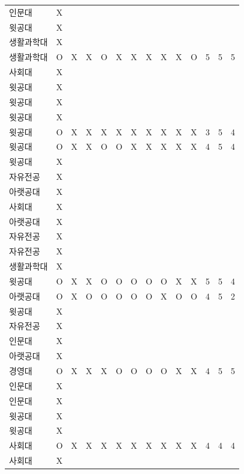 \documentclass[11pt,a4paper]{article}
\begin{document}
\begin{center}
\begin{supertabular}{ | p{2cm} | x{1.6cm} | x{0.5cm} | x{0.5cm} | x{0.5cm} | x{0.5cm} | x{0.5cm} | x{0.5cm} | x{0.5cm} | x{0.5cm} | x{0.5cm} | x{0.5cm} | x{0.5cm} | x{0.5cm} | }
인문대 & X & & & & & & & & & & & & \\
윗공대 & X & & & & & & & & & & & & \\
생활과학대 & X & & & & & & & & & & & & \\
생활과학대 & O & X & X & O & X & X & X & X & X & O & 5 & 5 & 5 \\
사회대 & X & & & & & & & & & & & & \\
윗공대 & X & & & & & & & & & & & & \\
윗공대 & X & & & & & & & & & & & & \\
윗공대 & X & & & & & & & & & & & & \\
윗공대 & O & X & X & X & X & X & X & X & X & X & 3 & 5 & 4 \\
윗공대 & O & X & X & O & O & X & X & X & X & X & 4 & 5 & 4 \\
윗공대 & X & & & & & & & & & & & & \\
자유전공 & X & & & & & & & & & & & & \\
아랫공대 & X & & & & & & & & & & & & \\
사회대 & X & & & & & & & & & & & & \\
아랫공대 & X & & & & & & & & & & & & \\
자유전공 & X & & & & & & & & & & & & \\
자유전공 & X & & & & & & & & & & & & \\
생활과학대 & X & & & & & & & & & & & & \\
윗공대 & O & X & X & O & O & O & O & O & X & X & 5 & 5 & 4 \\
아랫공대 & O & X & O & O & O & O & O & X & O & O & 4 & 5 & 2 \\
윗공대 & X & & & & & & & & & & & & \\
자유전공 & X & & & & & & & & & & & & \\
인문대 & X & & & & & & & & & & & & \\
아랫공대 & X & & & & & & & & & & & & \\
경영대 & O & X & X & X & O & O & O & O & X & X & 4 & 5 & 5 \\
인문대 & X & & & & & & & & & & & & \\
인문대 & X & & & & & & & & & & & & \\
윗공대 & X & & & & & & & & & & & & \\
윗공대 & X & & & & & & & & & & & & \\
사회대 & O & X & X & X & X & X & X & X & X & X & 4 & 4 & 4 \\
사회대 & X & & & & & & & & & & & & \\

\end{supertabular}
\end{center}
\end{document}

